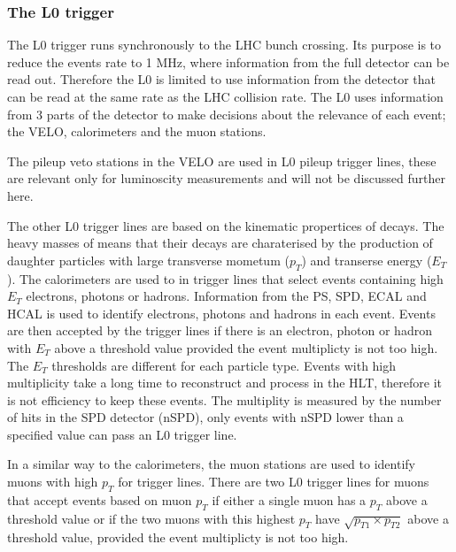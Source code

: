 \subsubsection{The L0 trigger}
\label{L0}


The L0 trigger runs synchronously to the LHC bunch crossing. Its purpose is to reduce the events rate to 1 MHz, where information from the full detector can be read out. Therefore the L0 is limited to use information from the detector that can be read at the same rate as the LHC collision rate.
The L0 uses information from 3 parts of the detector to make decisions about the relevance of each event; the VELO, calorimeters and the muon stations. 


The pileup veto stations in the VELO are used in L0 pileup trigger lines, these are relevant only for luminoscity measurements and will not be discussed further here.

The other L0 trigger lines are based on the kinematic propertices of \bhadron decays. The heavy masses of \bhadrons means that their decays are charaterised by the production of daughter particles with large transverse mometum ($p_{T}$) and transerse energy ($E_{T}$).
The calorimeters are used to in trigger lines that select events containing high $E_{T}$ electrons, photons or hadrons. Information from the PS, SPD, ECAL and HCAL is used to identify electrons, photons and hadrons in each event. Events are then accepted by the trigger lines if there is an  electron, photon or hadron with $E_{T}$ above a threshold value provided the event multiplicty is not too high. The $E_{T}$ thresholds are different for each particle type. Events with high multiplicity take a long time to reconstruct and process in the HLT, therefore it is not efficiency to keep these events. The multiplity is measured by the number of hits in the SPD detector (nSPD), only events with nSPD lower than a specified value can pass an L0 trigger line. 


In a similar way to the calorimeters, the muon stations are used to identify muons with high $p_{T}$ for trigger lines. There are two L0 trigger lines for muons that accept events based on muon $p_{T}$ if either a single muon has a $p_{T}$  above a threshold value or if the two muons with this highest $p_{T}$ have $\sqrt{p_{T1} \times p_{T2}}$ above a threshold value, provided the event multiplicty is not too high. %

